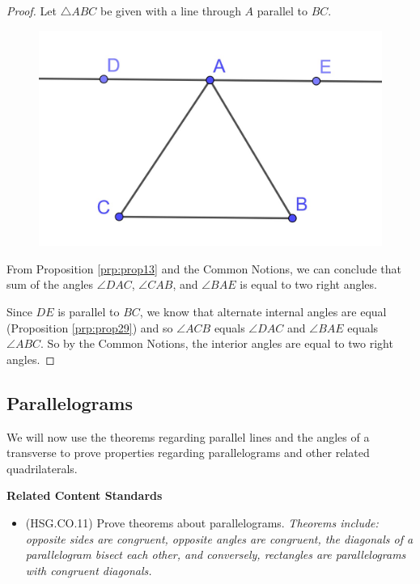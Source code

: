 \documentclass[
]{book}
\providecommand{\tightlist}{%
  \setlength{\itemsep}{0pt}\setlength{\parskip}{0pt}}
\newenvironment{standards}{}{}
\theoremstyle{definition}
\theoremstyle{definition}
\theoremstyle{definition}
\theoremstyle{definition}
\theoremstyle{remark}
\begin{document}
\begin{proof}
Let \(\triangle ABC\) be given with a line through \(A\) parallel to \(BC\).

\begin{figure}

{\centering \includegraphics[width=0.3\linewidth]{images/Angles-triangle} 

}

\end{figure}

From Proposition \ref{prp:prop13} and the Common Notions, we can conclude that sum of the angles \(\angle DAC\), \(\angle CAB\), and \(\angle BAE\) is equal to two right angles.

Since \(DE\) is parallel to \(BC\), we know that alternate internal angles are equal (Proposition \ref{prp:prop29}) and so \(\angle ACB\) equals \(\angle DAC\) and \(\angle BAE\) equals \(\angle ABC\). So by the Common Notions, the interior angles are equal to two right angles.
\end{proof}

\hypertarget{parallelograms}{%
\subsection{Parallelograms}\label{parallelograms}}

We will now use the theorems regarding parallel lines and the angles of a transverse to prove properties regarding parallelograms and other related quadrilaterals.

\begin{standards}

\begin{center}
\textbf{Related Content Standards}

\end{center}

\begin{itemize}
\tightlist
\item
  (HSG.CO.11) Prove theorems about parallelograms. \emph{Theorems include: opposite sides are congruent, opposite angles are congruent, the diagonals of a parallelogram bisect each other, and conversely, rectangles are parallelograms with congruent diagonals.}
\end{itemize}

\end{standards}
\end{document}
